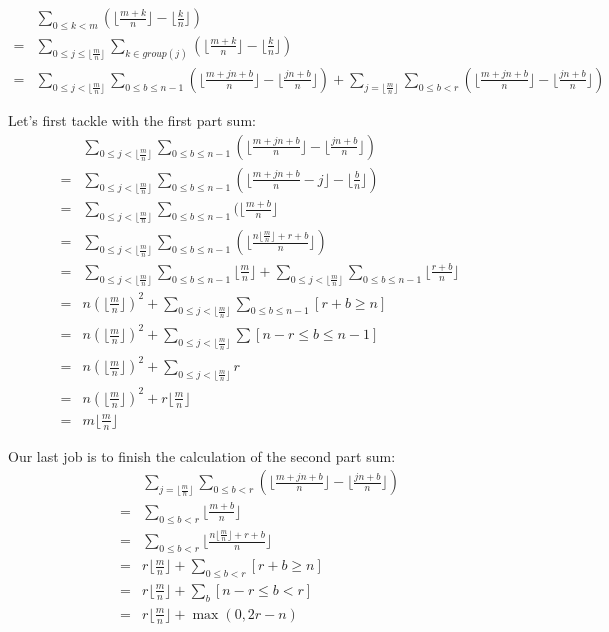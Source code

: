 \documentclass{article}
\begin{document}
\def \floormn {\lfloor \frac{m}{n} \rfloor}

\begin{equation}
    \begin{split}
        & \sum_{0\le k < m}(\lfloor \frac{m+k}{n} \rfloor - \lfloor \frac{k}{n} \rfloor)\\
      = & \sum_{0\le j \le \floormn}\sum_{k\in group(j)} (\lfloor \frac{m+k}{n} \rfloor - \lfloor \frac{k}{n} \rfloor)\\
      = & \sum_{0\le j < \floormn}\sum_{0\le b \le n-1} (\lfloor \frac{m+jn+b}{n} \rfloor - \lfloor \frac{jn+b}{n} \rfloor) + \sum_{j=\floormn}\sum_{0\le b < r} (\lfloor \frac{m+jn+b}{n} \rfloor - \lfloor \frac{jn+b}{n} \rfloor)
    \end{split}
\end{equation}

Let's first tackle with the first part sum:
\begin{equation}
    \begin{split}
        & \sum_{0\le j < \floormn}\sum_{0\le b \le n-1} (\lfloor \frac{m+jn+b}{n} \rfloor - \lfloor \frac{jn+b}{n} \rfloor) \\
      = & \sum_{0\le j < \floormn}\sum_{0\le b \le n-1} (\lfloor \frac{m+jn+b}{n} -j \rfloor - \lfloor \frac{b}{n} \rfloor) \\
      = & \sum_{0\le j < \floormn}\sum_{0\le b \le n-1} (\lfloor \frac{m+b}{n} \rfloor\\
      = & \sum_{0\le j < \floormn}\sum_{0\le b \le n-1} (\lfloor \frac{n\floormn + r + b}{n} \rfloor)\\
      = & \sum_{0\le j < \floormn}\sum_{0\le b \le n-1} \floormn + 
          \sum_{0\le j < \floormn}\sum_{0\le b \le n-1} \lfloor \frac{r+b}{n} \rfloor\\
      = & n(\floormn)^2 + \sum_{0\le j < \floormn}\sum_{0\le b \le n-1} \left[ r+b\ge n \right] \\
      = & n(\floormn)^2 + \sum_{0\le j < \floormn} \sum \left[n-r \le b \le n-1\right]\\
      = & n(\floormn)^2 + \sum_{0\le j < \floormn} r\\
      = & n(\floormn)^2 + r\floormn \\
      = & m\floormn
    \end{split}
\end{equation}

Our last job is to finish the calculation of the second part sum:
\begin{equation}
    \begin{split}
        & \sum_{j=\floormn}\sum_{0\le b < r} (\lfloor \frac{m+jn+b}{n} \rfloor - \lfloor \frac{jn+b}{n} \rfloor) \\
      = & \sum_{0\le b < r}\lfloor \frac{m+b}{n} \rfloor\\
      = & \sum_{0\le b < r} \lfloor \frac{n\floormn + r + b}{n} \rfloor\\
      = & r\floormn + \sum_{0 \le b < r}\left[r+b\ge n\right]\\
      = & r\floormn + \sum_{b}\left[n-r \le b < r \right]\\
      = & r\floormn + \max{(0, 2r-n)}
    \end{split}
\end{equation}
\end{document}

